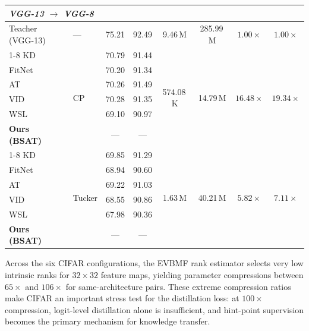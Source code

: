 \documentclass[conference]{IEEEtran}
\begin{document}
\begin{table}[t]
\begin{tabular}{llcccccc}
    \multicolumn{8}{l}{\textit{VGG-13 $\to$ VGG-8}} \\
    \midrule
    Teacher (VGG-13)     & — & 75.21 & 92.49 & 9.46\,M & 285.99\,M & $1.00\times$ & $1.00\times$ \\
    \cline{1-8}
    KD \cite{hinton2015distilling}                 & \multirow{6}{*}{CP}     & 70.79 & 91.44 & \multirow{6}{*}{574.08\,K} & \multirow{6}{*}{14.79\,M} & \multirow{6}{*}{$16.48\times$}    & \multirow{6}{*}{$19.34\times$} \\
    FitNet \cite{romero2015fitnetshintsdeepnets}   &                         & 70.20 & 91.34 & & & & \\
    AT \cite{zagoruyko2016paying}                  &                         & 70.26 & 91.49 & & & & \\
    VID \cite{ahn2019variational}                  &                         & 70.28 & 91.35 & & & & \\
    WSL \cite{zhou2021rethinking}                  &                         & 69.10 & 90.97 & & & & \\
    \textbf{Ours (BSAT)}                           &                         & — & — & & & & \\
    \cline{1-8}
    KD \cite{hinton2015distilling}                 & \multirow{6}{*}{Tucker} & 69.85 & 91.29 & \multirow{6}{*}{1.63\,M} & \multirow{6}{*}{40.21\,M} & \multirow{6}{*}{$5.82\times$}     & \multirow{6}{*}{$7.11\times$} \\
    FitNet \cite{romero2015fitnetshintsdeepnets}   &                         & 68.94 & 90.60 & & & & \\
    AT \cite{zagoruyko2016paying}                  &                         & 69.22 & 91.03 & & & & \\
    VID \cite{ahn2019variational}                  &                         & 68.55 & 90.86 & & & & \\
    WSL \cite{zhou2021rethinking}                  &                         & 67.98 & 90.36 & & & & \\
    \textbf{Ours (BSAT)}                           &                         & — & — & & & & \\
    \bottomrule
  \end{tabular}
\end{table}






Across the six CIFAR configurations, the EVBMF rank estimator selects very
low intrinsic ranks for $32{\times}32$ feature maps, yielding parameter
compressions between $65\times$ and $106\times$ for same-architecture pairs.
These extreme compression ratios make CIFAR an important stress test for the
distillation loss: at $100\times$ compression, logit-level distillation alone
is insufficient, and hint-point supervision becomes the primary mechanism
for knowledge transfer.
\end{document}
